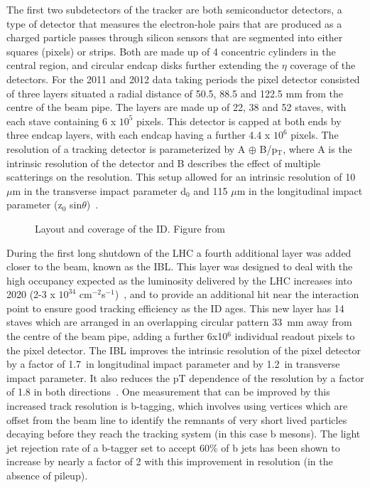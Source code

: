 The first two subdetectors of the tracker are both semiconductor detectors, a type of detector that measures the electron-hole pairs that are produced as a charged particle passes through silicon sensors that are segmented into either squares (pixels) or strips.  
Both are made up of 4 concentric cylinders in the central region, and circular endcap disks further extending the $\eta$ coverage of the detectors.  
For the 2011 and 2012 data taking periods the pixel detector consisted of three layers situated a radial distance of 50.5, 88.5 and 122.5 mm from the centre of the beam pipe.  
The layers are made up of 22, 38 and 52 staves, with each stave containing 6 x $10^5$ pixels.  
This detector is capped at both ends by three endcap layers, with each endcap having a further 4.4 x $10^6$ pixels.  
The resolution of a tracking detector is parameterized by A $\oplus$ B/p$_{\mathrm{T}}$, where A is the intrinsic resolution of the detector and B describes the effect of multiple scatterings on the resolution.  
This setup allowed for an intrinsic resolution of 10 $\mu$m in the transverse impact parameter d$_{0}$ and 115 $\mu$m in the longitudinal impact parameter (z$_{0}$ sin$\theta$)~\cite{ID3}. 

\begin{figure}[!ht]
 \begin{center}
 \end{center}
 \caption[Layout and coverage of the ID]
 {\small Layout and coverage of the ID.  Figure from ~\cite{Iwamoto:2013kla}}
 \label{IDCoverage}
\end{figure} 

During the first long shutdown of the LHC a fourth additional layer was added closer to the beam, known as the \gls{IBL}.  
This layer was designed to deal with the high occupancy expected as the luminosity delivered by the LHC increases into 2020 (2-3 x $10^{34}$ cm$^{-2}$s$^{-1}$)~\cite{IBL1}, and to provide an additional hit near the interaction point to ensure good tracking efficiency as the ID ages.  
This new layer has 14 staves which are arranged in an overlapping circular pattern 33~mm away from the centre of the beam pipe, adding a further 6x10$^6$ individual readout pixels to the pixel detector.
The IBL improves the intrinsic resolution of the pixel detector by a factor of 1.7~in longitudinal impact parameter and by 1.2~in transverse impact parameter.  
It also reduces the pT dependence of the resolution by a factor of 1.8 in both directions~\cite{IBL2}.  
One measurement that can be improved by this increased track resolution is b-tagging, which involves using vertices which are offset from the beam line to identify the remnants of very short lived particles decaying before they reach the tracking system (in this case b mesons).  
The light jet rejection rate of a b-tagger set to accept 60\% of b jets has been shown to increase by nearly a factor of 2 with this improvement in resolution (in the absence of pileup).

